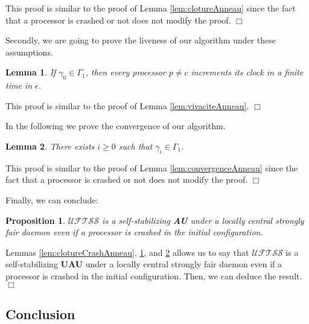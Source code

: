 \documentclass[11pt,english,letterpaper]{article}
\newtheorem{lemma}{Lemma}
\newtheorem{proposition}{Proposition}
\newenvironment{proof}{{\noindent\bf Proof. } }{{\hfill $\Box$}}
\begin{document}
\begin{proof}
This proof is similar to the proof of Lemma \ref{lem:clotureAnneau} since the fact that a processor is crashed or not does not modify the proof.
\end{proof}

Secondly, we are going to prove the liveness of our algorithm under these assumptions.

\begin{lemma}\label{lem:vivaciteCrashAnneau}
If $\gamma_{0}\in\Gamma_{1}$, then every processor $p\neq c$ increments its clock in a finite time in $\epsilon$.
\end{lemma}

\begin{proof}
This proof is similar to the proof of Lemma \ref{lem:vivaciteAnneau}.
\end{proof}
		
In the following we prove the convergence of our algorithm.

\begin{lemma}\label{lem:convergenceCrashAnneau}
There exists $i\geq 0$ such that $\gamma_{i}\in\Gamma_{1}$.
\end{lemma}

\begin{proof}
This proof is similar to the proof of Lemma \ref{lem:convergenceAnneau} since the fact that a processor is crashed or not does not modify the proof.
\end{proof}

Finally, we can conclude:

\begin{proposition}\label{prop:SSCrashAnneau}
$\mathcal{UFTSS}$ is a self-stabilizing \textbf{AU} under a locally central strongly fair daemon even if a processor is crashed in the initial configuration.
\end{proposition}

\begin{proof}
Lemmas \ref{lem:clotureCrashAnneau}, \ref{lem:vivaciteCrashAnneau}, and \ref{lem:convergenceCrashAnneau} allows us to say that $\mathcal{UFTSS}$ is a self-stabilizing \textbf{UAU} under a locally central strongly fair daemon even if a processor is crashed in the initial configuration. Then, we can deduce the result.
\end{proof}
		
\subsection{Conclusion}
\end{document}
